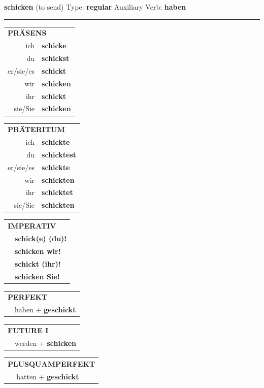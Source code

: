 \documentclass[10pt,a4paper]{revtex4-2}
\begin{document}
\begin{verbbox}
{\Large \bf schicken} (to send) \hfill Type: \textbf{regular} \hfill Auxiliary Verb: \textbf{haben}

\vspace{5pt}
\hrule
\vspace{5pt}

\begin{tabular}{rl}
\multicolumn{2}{l}{\textbf{PRÄSENS}}\\
ich & \textbf{schicke}\\
du & \textbf{schickst}\\
er/sie/es & \textbf{schickt}\\
wir & \textbf{schicken}\\
ihr & \textbf{schickt}\\
sie/Sie & \textbf{schicken}\\
\end{tabular}
\hfill
\begin{tabular}{rl}
\multicolumn{2}{l}{\textbf{PRÄTERITUM}}\\
ich & \textbf{schickte}\\
du & \textbf{schicktest}\\
er/sie/es & \textbf{schickte}\\
wir & \textbf{schickten}\\
ihr & \textbf{schicktet}\\
sie/Sie & \textbf{schickten}\\
\end{tabular}
\hfill
\begin{tabular}{rl}
\multicolumn{2}{l}{\textbf{IMPERATIV}}\\
& \textbf{schick(e) (du)!}\\
& \textbf{schicken wir!}\\
& \textbf{schickt (ihr)!}\\
& \textbf{schicken Sie!}\\
\end{tabular}

\vspace{10pt}

\begin{tabular}{rl}
\multicolumn{2}{l}{\textbf{PERFEKT}}\\
& haben + \textbf{geschickt}\\
\end{tabular}
\hfill
\begin{tabular}{rl}
\multicolumn{2}{l}{\textbf{FUTURE I}}\\
& werden + \textbf{schicken}\\
\end{tabular}
\hfill
\begin{tabular}{rl}
\multicolumn{2}{l}{\textbf{PLUSQUAMPERFEKT}}\\
& hatten + \textbf{geschickt}\\
\end{tabular}


\end{verbbox}
\end{document}
